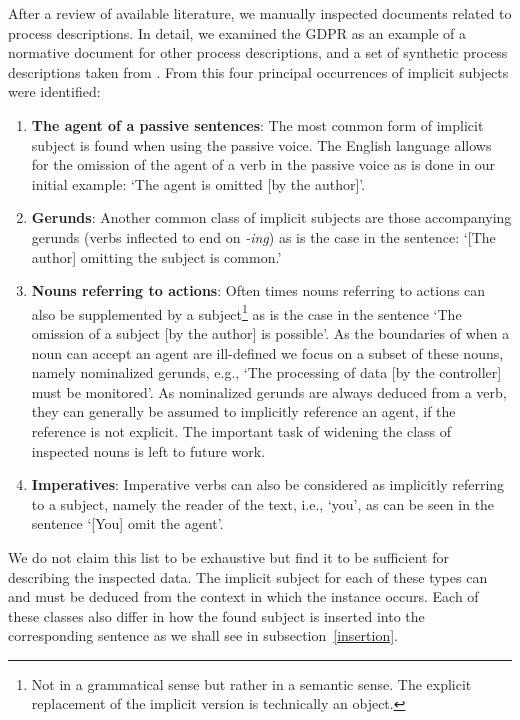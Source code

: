 \documentclass[times, 10pt,twocolumn]{article}
\begin{document}
After a review of available literature, we manually inspected documents related
to process descriptions. In detail, we examined the GDPR \cite{gdpr} as an example
of a normative document for other process descriptions, and a set of synthetic process
descriptions taken from \cite{NLP_bpm_data}. From this four principal occurrences of
implicit subjects were identified:

\begin{enumerate}
   \item \textbf{The agent of a passive sentences}: The most common form of implicit
   subject is found when using the passive voice. The English language allows for the
   omission of the agent of a verb in the passive voice as is done in our initial example:
   `The agent is omitted [by the author]'.
   \item \textbf{Gerunds}: Another common class of implicit subjects are those accompanying
   gerunds (verbs inflected to end on \textit{-ing}) as is the case in the sentence:
   `[The author] omitting the subject is common.' 
   \item \textbf{Nouns referring to actions}: Often times nouns referring to actions can also
   be supplemented by a subject\footnote{Not in a grammatical sense but rather in a semantic sense.
   The explicit replacement of the implicit version is technically an object.} as is the case in the
   sentence `The omission of a subject [by the author] is possible'. As the boundaries of when a noun
   can accept an agent are ill-defined we focus on a subset of these nouns, namely nominalized
   gerunds, e.g., `The processing of data [by the controller] must be monitored'. As nominalized gerunds
   are always deduced from a verb, they can generally be assumed to implicitly reference an agent, if 
   the reference is not explicit. The important task of widening the class of inspected nouns is
   left to future work.
   \item \textbf{Imperatives}: Imperative verbs can also be considered as implicitly referring to
   a subject, namely the reader of the text, i.e., `you', as can be seen in the sentence
   `[You] omit the agent'.
\end{enumerate}

We do not claim this list to be exhaustive but find it to be sufficient for describing the inspected data.
The implicit subject for each of these types can and must be deduced from the context in which the
instance occurs.
Each of these classes also differ in how the found subject is inserted into the corresponding
sentence as we shall see in subsection~\ref{insertion}.
\end{document}
